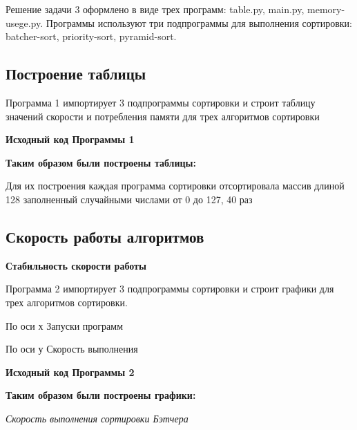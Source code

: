 Решение задачи 3 оформлено в виде трех программ: table.py, main.py, memory-usege.py. Программы используют три подпрограммы для выполнения сортировки: batcher-sort, priority-sort, pyramid-sort.


\subsection{Построение таблицы}


Программа 1 импортирует 3 подпрограммы сортировки и строит таблицу значений скорости и потребления памяти для трех алгоритмов сортировки

\textbf{Исходный код Программы 1}




\textbf{Таким образом были построены таблицы:}








Для их построения каждая программа сортировки отсортировала массив длиной 128 заполненный случайными числами от 0 до 127, 40 раз















\subsection{Скорость работы алгоритмов}


\begin{center}
    \textbf{Стабильность скорости работы}
\end{center}

Программа 2 импортирует 3 подпрограммы сортировки и строит графики для трех алгоритмов сортировки.

По оси х Запуски программ

По оси у Скорость выполнения 

\textbf{Исходный код Программы 2}




\textbf{Таким образом были построены графики:}

\textit{Скорость выполнения сортировки Бэтчера}

